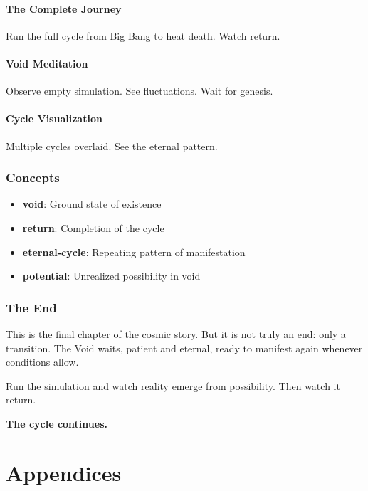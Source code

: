 \documentclass[
  11pt,
  letterpaper,
  twoside,
  openright]{book}
\providecommand{\tightlist}{%
  \setlength{\itemsep}{0pt}\setlength{\parskip}{0pt}}
\begin{document}
\subsection{The Complete Journey}\label{the-complete-journey}

Run the full cycle from Big Bang to heat death. Watch return.

\subsection{Void Meditation}\label{void-meditation}

Observe empty simulation. See fluctuations. Wait for genesis.

\subsection{Cycle Visualization}\label{cycle-visualization}

Multiple cycles overlaid. See the eternal pattern.

\section{Concepts}\label{concepts-44}

\begin{itemize}
\tightlist
\item
  \textbf{void}: Ground state of existence
\item
  \textbf{return}: Completion of the cycle
\item
  \textbf{eternal-cycle}: Repeating pattern of manifestation
\item
  \textbf{potential}: Unrealized possibility in void
\end{itemize}

\section{The End}\label{the-end}

This is the final chapter of the cosmic story. But it is not truly an
end: only a transition. The Void waits, patient and eternal, ready to
manifest again whenever conditions allow.

Run the simulation and watch reality emerge from possibility. Then watch
it return.

\textbf{The cycle continues.}

\part{Appendices}
\end{document}
